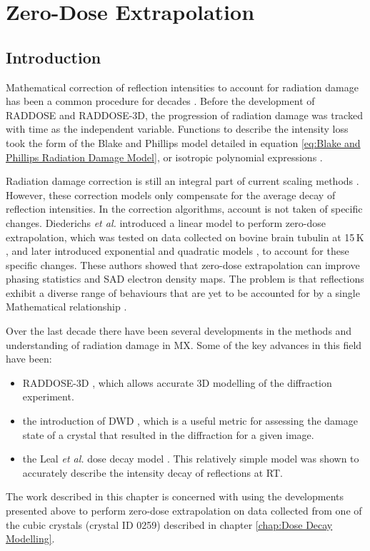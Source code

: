 \chapter{Zero-Dose Extrapolation}
\label{chap:Zero-Dose Extrapolation}

\section{Introduction}
\label{sec:Introduction - Zero-Dose extrapolation}
Mathematical correction of reflection intensities to account for radiation damage has been a common procedure for decades \cite{hendrickson1973,abrahams1987anisotropy}.
Before the development of RADDOSE and RADDOSE-3D, the progression of radiation damage was tracked with time as the independent variable.
Functions to describe the intensity loss took the form of the Blake and Phillips model detailed in equation \ref{eq:Blake and Phillips Radiation Damage Model}, or isotropic polynomial expressions \cite{abrahams1987anisotropy}.

Radiation damage correction is still an integral part of current scaling methods \cite{otwinowski2003multiparametric,evans2005,kabsch2010integration}.
However, these correction models only compensate for the average decay of reflection intensities.
In the correction algorithms, account is not taken of specific changes.
Diederichs \textit{et al.}  introduced a linear model to perform zero-dose extrapolation, which was tested on data collected on bovine brain tubulin at 15$\,$K \cite{diederichs2003}, and later introduced exponential and quadratic models \cite{diederichs2006}, to account for these specific changes.
These authors showed that zero-dose extrapolation can improve phasing statistics and SAD electron density maps.
The problem is that reflections exhibit a diverse range of behaviours that are yet to be accounted for by a single Mathematical relationship \cite{blake1962,abrahams1973}.

Over the last decade there have been several developments in the methods and understanding of radiation damage in MX.
Some of the key advances in this field have been:
\begin{itemize}
    \item RADDOSE-3D \cite{zeldin2013}, which allows accurate 3D modelling of the diffraction experiment.
    \item the introduction of DWD \cite{zeldin2013dwd}, which is a useful metric for assessing the damage state of a crystal that resulted in the diffraction for a given image.
    \item the Leal \textit{et al.} dose decay model \cite{leal2012}. This relatively simple model was shown to accurately describe the intensity decay of reflections at RT.
\end{itemize}
The work described in this chapter is concerned with using the developments presented above to perform zero-dose extrapolation on data collected from one of the cubic crystals (crystal ID 0259) described in chapter \ref{chap:Dose Decay Modelling}.
